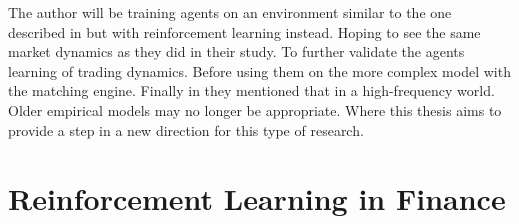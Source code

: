 \documentclass{kththesis}
\theoremstyle{definition}
\begin{document}
\newpage
The author will be training agents on an environment similar to the one described in \parencite{das2005learning} but with reinforcement learning instead. Hoping to see the same market dynamics as they did in their study. To further validate the agents learning of trading dynamics. Before using them on the more complex model with the matching engine. Finally in \textcite{o2015high} they mentioned that in a high-frequency world. Older empirical models may no longer be appropriate. Where this thesis aims to provide a step in a new direction for this type of research.

\section{Reinforcement Learning in Finance}
\end{document}
